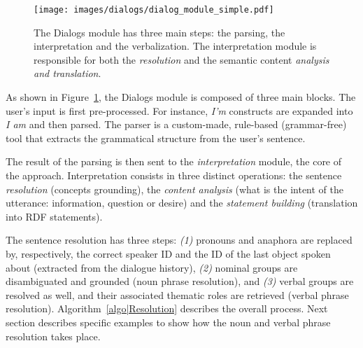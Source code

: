 \begin{figure}[!ht]
\centering
  \texttt{[image: images/dialogs/dialog\_module\_simple.pdf]}
  \caption{The {\sc Dialogs} module has three main steps: the parsing,
  the interpretation and the verbalization. The interpretation module is
  responsible for both the \emph{resolution} and the semantic content
  \emph{analysis and translation}.} 
  \label{fig|dialog}
\end{figure}

As shown in Figure~\ref{fig|dialog}, the {\sc Dialogs} module is composed of
three main blocks. The user's input is first pre-processed. For instance,
\emph{I'm} constructs are expanded into \emph{I am} and then parsed. The parser
is a custom-made, rule-based (\ie grammar-free) tool that extracts the
grammatical structure from the user's sentence.

The result of the parsing is then sent to the \emph{interpretation} module, the
core of the approach.  Interpretation consists in three distinct operations:
the sentence \emph{resolution} (concepts grounding), the \emph{content
analysis} (what is the intent of the utterance: information, question or
desire) and the \emph{statement building} (translation into RDF statements).

The sentence resolution has three steps: {\it(1)} pronouns and anaphora are
replaced by, respectively, the correct speaker ID and the ID of the last object
spoken about (extracted from the dialogue history), {\it(2)} nominal groups are
disambiguated and grounded (noun phrase resolution), and {\it(3)} verbal groups
are resolved as well, and their associated thematic roles are retrieved (verbal
phrase resolution). Algorithm~\ref{algo|Resolution} describes the overall
process.  Next section describes specific examples to show how the noun and
verbal phrase resolution takes place.

